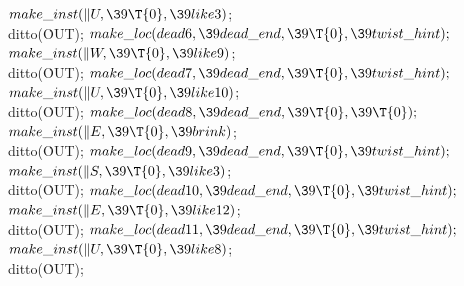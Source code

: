 ${}\\{make\_inst}(\|U,\39\T{0},\39\\{like3}){}$;\5
\\{ditto}(\.{OUT});\7
${}\\{make\_loc}(\\{dead6},\39\\{dead\_end},\39\T{0},\39\\{twist\_hint});{}$\6
${}\\{make\_inst}(\|W,\39\T{0},\39\\{like9}){}$;\5
\\{ditto}(\.{OUT});\7
${}\\{make\_loc}(\\{dead7},\39\\{dead\_end},\39\T{0},\39\\{twist\_hint});{}$\6
${}\\{make\_inst}(\|U,\39\T{0},\39\\{like10}){}$;\5
\\{ditto}(\.{OUT});\7
${}\\{make\_loc}(\\{dead8},\39\\{dead\_end},\39\T{0},\39\T{0});{}$\6
${}\\{make\_inst}(\|E,\39\T{0},\39\\{brink}){}$;\5
\\{ditto}(\.{OUT});\7
${}\\{make\_loc}(\\{dead9},\39\\{dead\_end},\39\T{0},\39\\{twist\_hint});{}$\6
${}\\{make\_inst}(\|S,\39\T{0},\39\\{like3}){}$;\5
\\{ditto}(\.{OUT});\7
${}\\{make\_loc}(\\{dead10},\39\\{dead\_end},\39\T{0},\39\\{twist\_hint});{}$\6
${}\\{make\_inst}(\|E,\39\T{0},\39\\{like12}){}$;\5
\\{ditto}(\.{OUT});\7
${}\\{make\_loc}(\\{dead11},\39\\{dead\_end},\39\T{0},\39\\{twist\_hint});{}$\6
${}\\{make\_inst}(\|U,\39\T{0},\39\\{like8}){}$;\5
\\{ditto}(\.{OUT});\par
\fi

